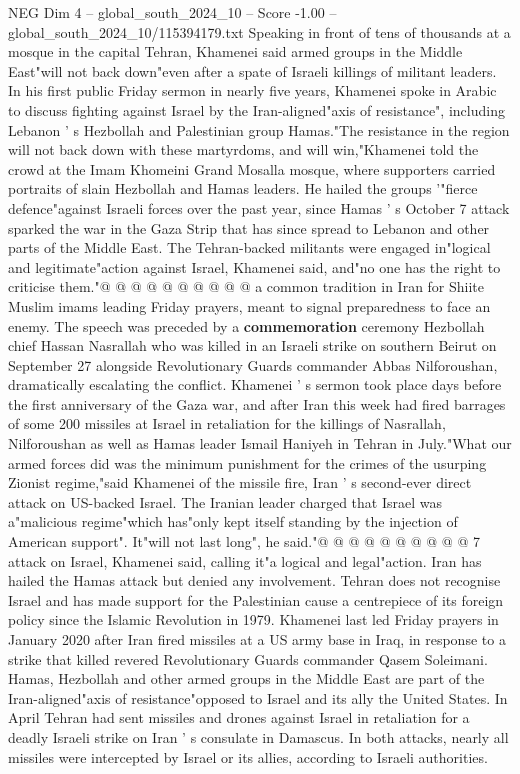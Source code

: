 \begin{textsample}{NEG Dim 4 – global\_south\_2024\_10 – Score -1.00 – global\_south\_2024\_10/115394179.txt}  \label{ex:f4_neg_061}
Speaking in front of tens of thousands at a mosque in the capital Tehran, Khamenei said armed groups in the Middle East"will not back down"even after a spate of Israeli killings of militant leaders.
In his first public Friday sermon in nearly five years, Khamenei spoke in Arabic to discuss fighting against Israel by the Iran-aligned"axis of resistance", including Lebanon ' s Hezbollah and Palestinian group Hamas."The resistance in the region will not back down with these martyrdoms, and will win,"Khamenei told the crowd at the Imam Khomeini Grand Mosalla mosque, where supporters carried portraits of slain Hezbollah and Hamas leaders.
He hailed the groups '"fierce defence"against Israeli forces over the past year, since Hamas ' s October 7 attack sparked the war in the Gaza Strip that has since spread to Lebanon and other parts of the Middle East.
The Tehran-backed militants were engaged in"logical and legitimate"action against Israel, Khamenei said, and"no one has the right to criticise them."@ @ @ @ @ @ @ @ @ @ a common tradition in Iran for Shiite Muslim imams leading Friday prayers, meant to signal preparedness to face an enemy.
The speech was preceded by a \textbf{commemoration} ceremony Hezbollah chief Hassan Nasrallah who was killed in an Israeli strike on southern Beirut on September 27 alongside Revolutionary Guards commander Abbas Nilforoushan, dramatically escalating the conflict.
Khamenei ' s sermon took place days before the first anniversary of the Gaza war, and after Iran this week had fired barrages of some 200 missiles at Israel in retaliation for the killings of Nasrallah, Nilforoushan as well as Hamas leader Ismail Haniyeh in Tehran in July."What our armed forces did was the minimum punishment for the crimes of the usurping Zionist regime,"said Khamenei of the missile fire, Iran ' s second-ever direct attack on US-backed Israel.
The Iranian leader charged that Israel was a"malicious regime"which has"only kept itself standing by the injection of American support".
It"will not last long", he said."@ @ @ @ @ @ @ @ @ @ 7 attack on Israel, Khamenei said, calling it"a logical and legal"action.
Iran has hailed the Hamas attack but denied any involvement.
Tehran does not recognise Israel and has made support for the Palestinian cause a centrepiece of its foreign policy since the Islamic Revolution in 1979.
Khamenei last led Friday prayers in January 2020 after Iran fired missiles at a US army base in Iraq, in response to a strike that killed revered Revolutionary Guards commander Qasem Soleimani.
Hamas, Hezbollah and other armed groups in the Middle East are part of the Iran-aligned"axis of resistance"opposed to Israel and its ally the United States.
In April Tehran had sent missiles and drones against Israel in retaliation for a deadly Israeli strike on Iran ' s consulate in Damascus.
In both attacks, nearly all missiles were intercepted by Israel or its allies, according to Israeli authorities.

\end{textsample}

